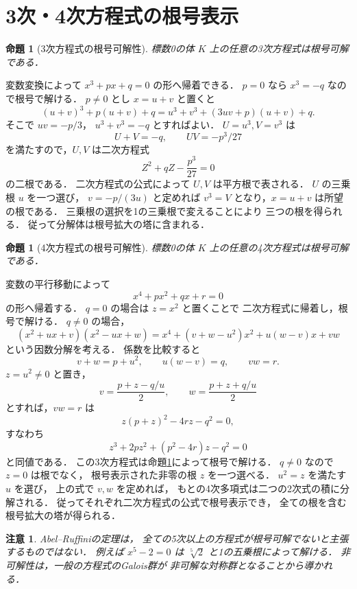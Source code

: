 \documentclass[a5paper,10pt,onecolumn]{jsarticle}
\makeatletter
\theoremstyle{mathnotetheorem}
\newtheorem{proposition}[theorem]{命題}
\newtheorem{remark}[theorem]{注意}
\renewcommand{\proofname}{証明}
\renewenvironment{proof}[1][\proofname]{%
  \par\pushQED{\qed}\normalfont\topsep4\p@\@plus2\p@\relax
  \trivlist\item[\hskip\labelsep\bfseries #1]\ignorespaces
}{\popQED\endtrivlist\@endpefalse}
\makeatother
\begin{document}
\section{3次・4次方程式の根号表示}

\begin{proposition}[3次方程式の根号可解性]\label{prop:cubic}
標数0の体 $K$ 上の任意の3次方程式は根号可解である．
\end{proposition}
\begin{proof}
変数変換によって
$x^3+px+q=0$ の形へ帰着できる．
$p=0$ なら $x^3=-q$ なので根号で解ける．
$p\ne0$ とし $x=u+v$ と置くと
\[
 (u+v)^3+p(u+v)+q
 =u^3+v^3+(3uv+p)(u+v)+q.
\]
そこで $uv=-p/3$，
$u^3+v^3=-q$ とすればよい．
$U=u^3,V=v^3$ は
\[
 U+V=-q,\qquad UV=-p^3/27
\]
を満たすので，$U,V$ は二次方程式
\[
 Z^2+qZ-\frac{p^3}{27}=0
\]
の二根である．
二次方程式の公式によって $U,V$ は平方根で表される．
$U$ の三乗根 $u$ を一つ選び，
$v=-p/(3u)$ と定めれば
$v^3=V$ となり，$x=u+v$ は所望の根である．
三乗根の選択を1の三乗根で変えることにより
三つの根を得られる．
従って分解体は根号拡大の塔に含まれる．
\end{proof}

\begin{proposition}[4次方程式の根号可解性]\label{prop:quartic}
標数0の体 $K$ 上の任意の4次方程式は根号可解である．
\end{proposition}
\begin{proof}
変数の平行移動によって
\[
 x^4+px^2+qx+r=0
\]
の形へ帰着する．
$q=0$ の場合は $z=x^2$ と置くことで
二次方程式に帰着し，根号で解ける．
$q\ne0$ の場合，
\[
 (x^2+ux+v)(x^2-ux+w)
 =x^4+(v+w-u^2)x^2+u(w-v)x+vw
\]
という因数分解を考える．
係数を比較すると
\[
 v+w=p+u^2,\qquad u(w-v)=q,\qquad vw=r.
\]
$z=u^2\ne0$ と置き，
\[
 v=\frac{p+z-q/u}{2},\qquad
 w=\frac{p+z+q/u}{2}
\]
とすれば，$vw=r$ は
\[
 z(p+z)^2-4rz-q^2=0,
\]
すなわち
\[
 z^3+2pz^2+(p^2-4r)z-q^2=0
\]
と同値である．
この3次方程式は命題\ref{prop:cubic}によって根号で解ける．
$q\ne0$ なので $z=0$ は根でなく，
根号表示された非零の根 $z$ を一つ選べる．
$u^2=z$ を満たす $u$ を選び，
上の式で $v,w$ を定めれば，
もとの4次多項式は二つの2次式の積に分解される．
従ってそれぞれ二次方程式の公式で根号表示でき，
全ての根を含む根号拡大の塔が得られる．
\end{proof}

\begin{remark}
Abel--Ruffiniの定理は，
全ての5次以上の方程式が根号可解でないと主張するものではない．
例えば $x^5-2=0$ は
$\sqrt[5]{2}$ と1の五乗根によって解ける．
非可解性は，\emph{一般の}方程式のGalois群が
非可解な対称群となることから導かれる．
\end{remark}
\end{document}
